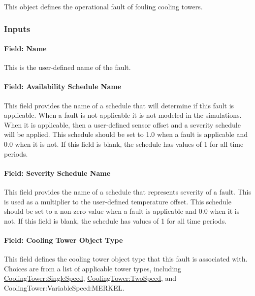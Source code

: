 This object defines the operational fault of fouling cooling towers.

\subsubsection{Inputs}

\paragraph{Field: Name}

This is the user-defined name of the fault.

\paragraph{Field: Availability Schedule Name}

This field provides the name of a schedule that will determine if this fault is applicable. When a fault is not applicable it is not modeled in the simulations. When it is applicable, then a user-defined sensor offset and a severity schedule will be applied. This schedule should be set to 1.0 when a fault is applicable and 0.0 when it is not. If this field is blank, the schedule has values of 1 for all time periods.

\paragraph{Field: Severity Schedule Name}\label{field-severity-schedule-name}

This field provides the name of a schedule that represents severity of a fault. This is used as a multiplier to the user-defined temperature offset. This schedule should be set to a non-zero value when a fault is applicable and 0.0 when it is not. If this field is blank, the schedule has values of 1 for all time periods.

\paragraph{Field: Cooling Tower Object Type}\label{field-tower-object-type}

This field defines the cooling tower object type that this fault is associated with. Choices are from a list of applicable tower types, including \hyperref[coolingtowersinglespeed]{CoolingTower:SingleSpeed}, \hyperref[coolingtowertwospeed]{CoolingTower:TwoSpeed}, and CoolingTower:VariableSpeed:MERKEL.

